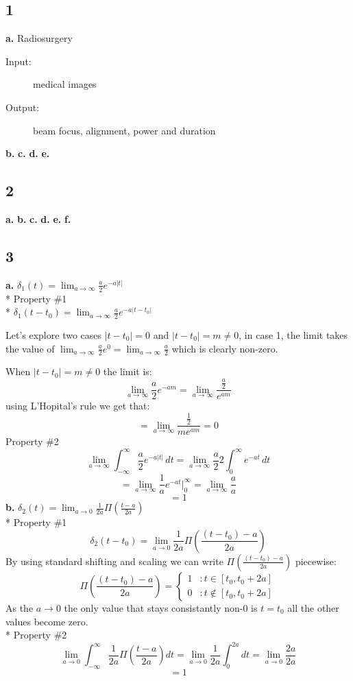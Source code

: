 \documentclass[10pt, letterpaper]{article}
\newcommand{\ind}[2]{
	\begin{addmargin}[#1]{0pt}
		{#2}
	\end{addmargin}
}
\begin{document}
\subsection*{1}
\textbf{a.} Radiosurgery

\ind{4 em}{
\begin{description}
    \item[Input:] medical images
    \item[Output:] beam focus, alignment, power and duration
\end{description}
}

\textbf{b.}
\textbf{c.}
\textbf{d.}
\textbf{e.}
\subsection*{2}

\textbf{a.}
\textbf{b.}
\textbf{c.}
\textbf{d.}
\textbf{e.}
\textbf{f.}
\subsection*{3}
\textbf{a.}
$\delta_1(t) = \lim_{a \to \infty} \frac{a}{2} e^{-a|t|}$\\*
Property \#1 \\*
$\delta_1(t - t_0) = \lim_{a \to \infty} \frac{a}{2} e^{-a|t - t_0|}$

Let's explore two cases $|t - t_0| = 0$ and $|t - t_0| = m \neq 0$, in case 1, 
the limit takes the value of $\lim_{a \to \infty} \frac{a}{2} e^{0} = \lim_{a \to \infty} \frac{a}{2}$ 
which is clearly non-zero.

When $|t - t_0| = m \neq 0$ the limit is:
\[
\lim_{a \to \infty} \frac{a}{2} e^{-am} = 
\lim_{a \to \infty} \frac{\frac{a}{2} }{e^{am}}
\]
using L'Hopital's rule we get that:
\[ =
\lim_{a \to \infty} \frac{\frac{1}{2} }{me^{am}} = 0
\]
Property \#2
\[
\lim_{a \to \infty} \int_{-\infty}^{\infty}\frac{a}{2} e^{-a|t|}\,dt = 
\lim_{a \to \infty} \frac{a}{2} 2 \int_{0}^{\infty} e^{-at}\,dt 
\]
\[
= \lim_{a \to \infty} \frac{1}{a} e^{-at} |_{0}^{\infty}
= \lim_{a \to \infty} \frac{a}{a}
\]
\[= 1\]
\textbf{b.}
$\delta_2(t) = \lim_{a \to 0} \frac{1}{2a} \Pi(\frac{t - a}{2a})$\\*
Property \#1
\[
\delta_2(t - t_0) = \lim_{a \to 0} \frac{1}{2a} \Pi(\frac{(t -t_0) - a}{2a})
\]
By using standard shifting and scaling we can write $\Pi(\frac{(t -t_0) - a}{2a})$ piecewise:
\[\Pi(\frac{(t -t_0) - a}{2a}) = \left\{
  \begin{array}{lr}
    1 & : t \in [t_0, t_0 + 2a]\\
    0 & : t \not\in [t_0, t_0 + 2a]
  \end{array}
\right.
\]
As the $a \to 0$ the only value that stays consistantly non-0 is $t = t_0$
all the other values become zero.
\\*
Property \#2
\[
\lim_{a \to 0} \int_{-\infty}^{\infty}\frac{1}{2a} \Pi(\frac{t - a}{2a})dt = 
\lim_{a \to 0} \frac{1}{2a} \int_{0}^{2a}dt 
= \lim_{a \to 0} \frac{2a}{2a} 
\]
\[= 1\]
\end{document}
